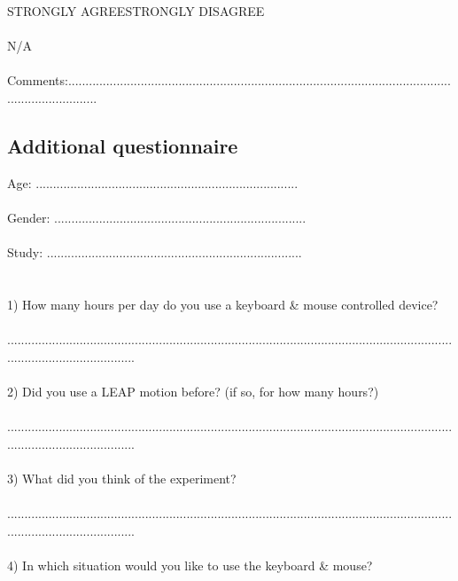 \begin{appendix}
{STRONGLY AGREE\tab\tab\tab\tab\tab STRONGLY DISAGREE\\
\\
\tab\tab N/A\\
\\
Comments:.........................................................................................................................................

\newpage
\subsection{Additional questionnaire}


Age: ............................................................................\\
\\
Gender: .........................................................................\\
\\
Study: ..........................................................................\\
\\
\\
1) How many hours per day do you use a keyboard \& mouse controlled device?\\
\\
......................................................................................................................................................................\\
\\
2) Did you use a LEAP motion before? (if so, for how many hours?)\\
\\
......................................................................................................................................................................\\
\\
3) What did you think of the experiment?\\
\\
......................................................................................................................................................................\\
\\
4) In which situation would you like to use the keyboard \& mouse?\\
\\
}
\end{appendix}
